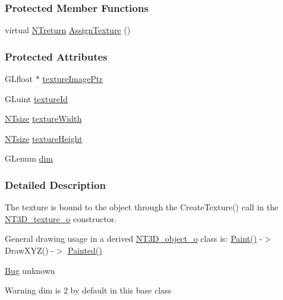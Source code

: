 \subsubsection*{Protected Member Functions}
\begin{DoxyCompactItemize}
\item 
virtual \hyperlink{nt__types_8h_ab9564ee8f091e809d21b8451c6683c53}{NTreturn} \hyperlink{class_n_t3_d__texture__o_a7929daf1a35917781c16cff5747ba964}{AssignTexture} ()
\end{DoxyCompactItemize}
\subsubsection*{Protected Attributes}
\begin{DoxyCompactItemize}
\item 
GLfloat $\ast$ \hyperlink{class_n_t3_d__texture__o_abbb78294ccb0650a5bd085c1d60d0759}{textureImagePtr}
\item 
GLuint \hyperlink{class_n_t3_d__texture__o_a0f326374cfd136461bba56b639832b0f}{textureId}
\item 
\hyperlink{nt__types_8h_a06c124f2e4469769b58230253ce0560b}{NTsize} \hyperlink{class_n_t3_d__texture__o_acb9b5da794cfd769b64ced6ecd57d5ee}{textureWidth}
\item 
\hyperlink{nt__types_8h_a06c124f2e4469769b58230253ce0560b}{NTsize} \hyperlink{class_n_t3_d__texture__o_a5c97eb2b83dbd8d9634bce95c61c4cb3}{textureHeight}
\item 
GLenum \hyperlink{class_n_t3_d__texture__o_a38d33eace7385397fd293170738ba6f6}{dim}
\end{DoxyCompactItemize}


\subsubsection{Detailed Description}
The texture is bound to the object through the CreateTexture() call in the \hyperlink{class_n_t3_d__texture__o}{NT3D\_\-texture\_\-o} constructor.

General drawing usage in a derived \hyperlink{class_n_t3_d__object__o}{NT3D\_\-object\_\-o} class is: \hyperlink{class_n_t3_d__texture__o_a7d74c7d3fd43620cf1315292c6b30561}{Paint()} -\/$>$ DrawXYZ() -\/$>$ \hyperlink{class_n_t3_d__texture__o_aec31080f0bde868b529bce81170effad}{Painted()}

\begin{Desc}
\item[\hyperlink{bug__bug000042}{Bug}]unknown \end{Desc}
\begin{DoxyWarning}{Warning}
dim is 2 by default in this base class 
\end{DoxyWarning}


